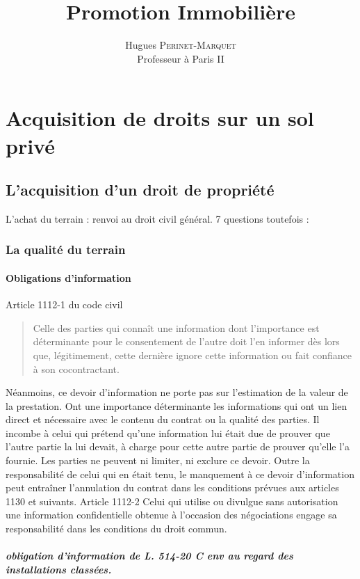 \documentclass[11pt,a4paper]{report}
\title{Promotion Immobilière}
\author{Hugues \textsc{Perinet-Marquet} \\
	Professeur à Paris II}
\begin{document}
	\maketitle
	\part{Acquisition de droits sur un sol privé}
	\chapter{L’acquisition d’un droit de propriété}
	L’achat du terrain : renvoi au droit civil général.
	7 questions toutefois :
	\section{La qualité du terrain}
	\subsection{Obligations d’information}
	Article 1112-1 du code civil
	\begin{quotation}
		Celle des parties qui connaît une information dont l'importance est déterminante pour le consentement de l'autre
	doit l'en informer dès lors que, légitimement, cette dernière ignore cette information ou fait confiance à son
	cocontractant.
	\end{quotation}
	Néanmoins, ce devoir d'information ne porte pas sur l'estimation de la valeur de la prestation.
	Ont une importance déterminante les informations qui ont un lien direct et nécessaire avec le contenu du contrat
	ou la qualité des parties.
	Il incombe à celui qui prétend qu'une information lui était due de prouver que l'autre partie la lui devait, à
	charge pour cette autre partie de prouver qu'elle l'a fournie.
	Les parties ne peuvent ni limiter, ni exclure ce devoir.
	Outre la responsabilité de celui qui en était tenu, le manquement à ce devoir d'information peut entraîner
	l'annulation du contrat dans les conditions prévues aux articles 1130 et suivants.
	Article 1112-2
	Celui qui utilise ou divulgue sans autorisation une information confidentielle obtenue à l'occasion des
	négociations engage sa responsabilité dans les conditions du droit commun.
	\subsubsection{obligation d’information de L. 514-20 C env au regard des installations classées.}
\end{document}
